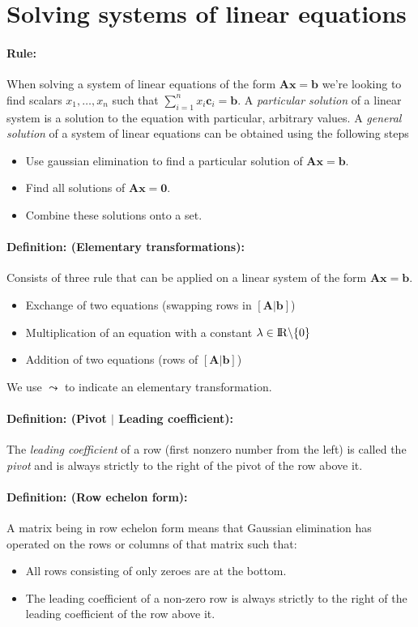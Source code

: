 \documentclass[12pt]{article}
\newcommand{\R}{{\rm I\!R}}
\newcommand{\A}{{\bm{A}}}
\newcommand{\xdefinition}[2]{\paragraph{\colorbox{#1!30}{\textbf{Definition:}} (#2):}}
\newcommand{\xrule}[1]{\paragraph{\colorbox{#1!30}{\textbf{Rule:}}}}
\begin{document}
\section{Solving systems of linear equations}

\xrule{blue} When solving a system of linear equations of the form $\bm{Ax} = \bm{b}$ we're looking to find scalars $x_1, \dots, x_n$ such that $\sum\nolimits_{i=1}^{n} x_i \bm{c}_i = \bm{b}$. A \textit{particular solution} of a linear system is a solution to the equation with particular, arbitrary values. A \textit{general solution} of a system of linear equations can be obtained using the following steps
%
\begin{itemize}
	\item Use gaussian elimination to find a particular solution of $\A \bm{x} = \bm{b}$.
	\item Find all solutions of $\A\bm{x} = \bm{0}$.
	\item Combine these solutions onto a set.
\end{itemize}

\xdefinition{green}{Elementary transformations} Consists of three rule that can be applied on a linear system of the form $\A \bm{x} = \bm{b}$.
%
\begin{itemize}
	\item Exchange of two equations (swapping rows in $[\A | \bm{b}]$)
	\item Multiplication of an equation with a constant $\lambda \in \R \backslash \{0\}$
	\item Addition of two equations (rows of $[\A | \bm{b}]$)
\end{itemize}
%
We use $\leadsto$ to indicate an elementary transformation.

\xdefinition{green}{Pivot $|$ Leading coefficient} The \textit{leading coefficient} of a row (first nonzero number from the left) is called the \textit{pivot} and is always strictly to the right of the pivot of the row above it.

\xdefinition{green}{Row echelon form} A matrix being in row echelon form means that Gaussian elimination has operated on the rows or columns of that matrix such that:
%
\begin{itemize}
	\item All rows consisting of only zeroes are at the bottom.
	\item The leading coefficient of a non-zero row is always strictly to the right of the leading coefficient of the row above it.
\end{itemize}
\end{document}

